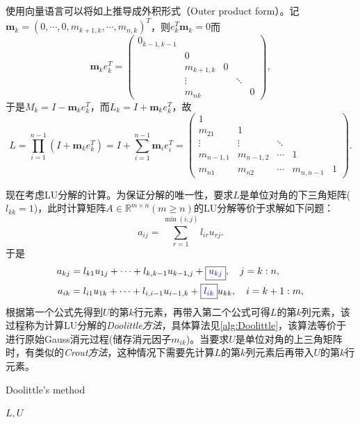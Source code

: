 \documentclass[a4paper,10pt]{ctexart}
\begin{document}
\noindent 使用向量语言可以将如上推导成外积形式（Outer product form）。记$ \bm{m}_k = (0,\cdots ,0,m_{k+1,k},\cdots ,m_{n,k})^T $，则$ e_k^T \bm{m}_k=0 $而
\[
    \bm{m}_k  e_k^T = 
    \begin{pmatrix}
        0_{k-1,k-1} & & & & \\
        & 0 & & & \\
        & m_{k+1,k} & 0 & &\\
        & \vdots & & \ddots &\\
        & m_{nk} & & & 0
    \end{pmatrix},
\]
于是$ M_k = I - \bm{m}_k e_k^T $，而$ L_k = I + \bm{m}_k e^T_k $，故
\[
    L = \prod_{i=1}^{n-1}(I+\bm{m}_k e_k^T) = I + \sum_{i=1}^{n-1}\bm{m}_i e_i^T = 
    \begin{pmatrix}
        1 & & & & \\
        m_{21} & 1 & & & \\
        \vdots & \vdots & \ddots & &\\
        m_{n-1,1} & m_{n-1,2} & \cdots & 1 &\\
        m_{n1} & m_{n2} & \cdots & m_{n,n-1} & 1
    \end{pmatrix}.
\]

现在考虑LU分解的计算。为保证分解的唯一性，要求$ L $是单位对角的下三角矩阵($ l_{kk}=1 $)，此时计算矩阵$ A\in \mathbb{R}^{m\times n} (m\geqslant n)$的LU分解等价于求解如下问题：
\begin{equation}
    a_{ij} = \sum_{r=1}^{\min(i,j)} l_{ir} u_{rj}.
\end{equation}
于是
\[
    \begin{aligned}
        a_{kj} &= l_{k1}u_{1 j}+\cdots +l_{k,k-1}u_{k-1,j}+ \boxed{\textcolor{blue}{u_{kj}}},\quad j=k:n,\\
        a_{ik} &= l_{i1}u_{1 k}+\cdots +l_{i,i-1}u_{i-1,k}+ \boxed{\textcolor{blue}{l_{ik}}}u_{kk},\quad i=k+1:m,
    \end{aligned}
\]
根据第一个公式先得到$ U $的第$ k $行元素，再带入第二个公式可得$ L $的第$ k $列元素，该过程称为计算LU分解的\emph{Doolittle方法}，具体算法见\ref{alg:Doolittle}，该算法等价于进行原始Gauss消元过程(储存消元因子$ m_{ik} $)。当要求$ U $是单位对角的上三角矩阵时，有类似的\emph{Crout方法}，这种情况下需要先计算$ L $的第$ k $列元素后再带入$ U $的第$ k $行元素。

\begin{algorithm}[htbp]
    \caption{Doolittle's method}\label{alg:Doolittle}
    \Return $ L,U $\;
\end{algorithm}
\end{document}
